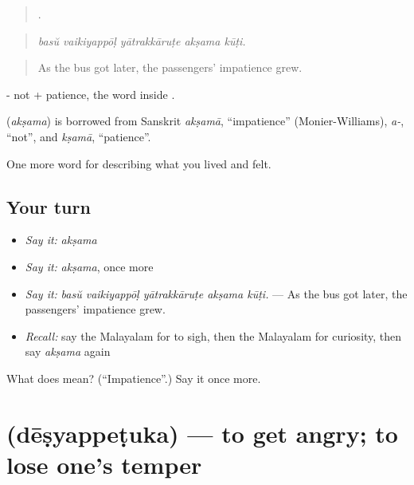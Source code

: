 \begin{quote}
    .
\end{quote}

\begin{quote}
\emph{basŭ vaikiyappōḷ yātrakkāruṭe akṣama kūṭi.}
\end{quote}

\begin{quote}
As the bus got later, the passengers' impatience grew.
\end{quote}

- not +  patience, the word inside .

\begin{cousinweb}
\textbf{} (\emph{akṣama}) is borrowed from Sanskrit \emph{akṣamā}, \textquotedblleft{}impatience\textquotedblright{} (Monier-Williams), \emph{a-}, \textquotedblleft{}not\textquotedblright{}, and \emph{kṣamā}, \textquotedblleft{}patience\textquotedblright{}.
\end{cousinweb}

\begin{grammarlens}[title={What you've built}]
One more word for describing what you lived and felt.
\end{grammarlens}

\subsection*{Your turn}
\begin{itemize}
\raggedright
  \item \emph{Say it:} \emph{akṣama}
  \item \emph{Say it:} \emph{akṣama}, once more
  \item \emph{Say it:} \emph{basŭ vaikiyappōḷ yātrakkāruṭe akṣama kūṭi.} — As the bus got later, the passengers' impatience grew.
  \item \emph{Recall:} say the Malayalam for to sigh, then the Malayalam for curiosity, then say \emph{akṣama} again
\end{itemize}

\begin{tcolorbox}[breakable,colback=teal!4,colframe=teal!35!black,title={Before you move on}]
What does  mean? (\textquotedblleft{}Impatience\textquotedblright{}.) Say it once more.
\end{tcolorbox}
\section[\texorpdfstring{\ml{ദേഷ്യപ്പെടുക} (dēṣyappeṭuka)}{ദേഷ്യപ്പെടുക (dēṣyappeṭuka)}]{ (dēṣyappeṭuka) — to get angry; to lose one's temper}

